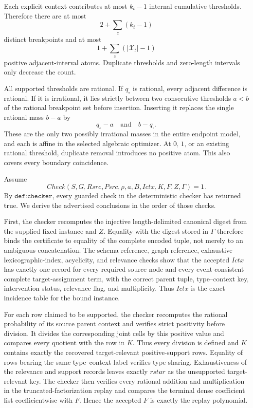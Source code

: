 Each explicit context contributes at most \(k_t-1\) internal cumulative thresholds.  Therefore there are at most
\[
 2+\sum_c(k_t-1)
\]
distinct breakpoints and at most
\[
 1+\sum_c(|\mathcal X_t|-1)
\]
positive adjacent-interval atoms.  Duplicate thresholds and zero-length intervals only decrease the count.

All supported thresholds are rational.  If \(q_\circ\) is rational, every adjacent difference is rational.  If it is irrational, it lies strictly between two consecutive thresholds \(a<b\) of the rational breakpoint set before insertion.  Inserting it replaces the single rational mass \(b-a\) by
\[
 q_\circ-a
 \quad\text{and}\quad
 b-q_\circ.
\]
These are the only two possibly irrational masses in the entire endpoint model, and each is affine in the selected algebraic optimizer.  At \(0\), \(1\), or an existing rational threshold, duplicate removal introduces no positive atom.  This also covers every boundary coincidence.

Assume
\[
 Check(S,G,Rsrc,Psrc,\rho,a,B,Ictx,K,F,Z,\Gamma)=1.
\]
By \(\texttt{def:checker}\), every guarded check in the deterministic checker has returned true.  We derive the advertised conclusions in the order of those checks.

First, the checker recomputes the injective length-delimited canonical digest from the supplied fixed instance and \(Z\).  Equality with the digest stored in \(\Gamma\) therefore binds the certificate to equality of the complete encoded tuple, not merely to an ambiguous concatenation.  The schema-reference, graph-reference, exhaustive lexicographic-index, acyclicity, and relevance checks show that the accepted \(Ictx\) has exactly one record for every required source node and every event-consistent complete target-assignment term, with the correct parent tuple, type--context key, intervention status, relevance flag, and multiplicity.  Thus \(Ictx\) is the exact incidence table for the bound instance.

For each row claimed to be supported, the checker recomputes the rational probability of its source parent context and verifies strict positivity before division.  It divides the corresponding joint cells by this positive value and compares every quotient with the row in \(K\).  Thus every division is defined and \(K\) contains exactly the recovered target-relevant positive-support rows.  Equality of rows bearing the same type--context label verifies type sharing.  Exhaustiveness of the relevance and support records leaves exactly \(rstar\) as the unsupported target-relevant key.  The checker then verifies every rational addition and multiplication in the truncated-factorization replay and compares the terminal dense coefficient list coefficientwise with \(F\).  Hence the accepted \(F\) is exactly the replay polynomial.


